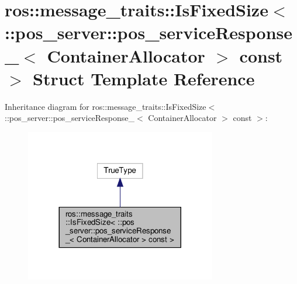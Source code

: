 \hypertarget{structros_1_1message__traits_1_1IsFixedSize_3_01_1_1pos__server_1_1pos__serviceResponse___3_01Co91c5eac0a9bc81187c37812e12655669}{}\section{ros\+:\+:message\+\_\+traits\+:\+:Is\+Fixed\+Size$<$ \+:\+:pos\+\_\+server\+:\+:pos\+\_\+service\+Response\+\_\+$<$ Container\+Allocator $>$ const $>$ Struct Template Reference}
\label{structros_1_1message__traits_1_1IsFixedSize_3_01_1_1pos__server_1_1pos__serviceResponse___3_01Co91c5eac0a9bc81187c37812e12655669}


Inheritance diagram for ros\+:\+:message\+\_\+traits\+:\+:Is\+Fixed\+Size$<$ \+:\+:pos\+\_\+server\+:\+:pos\+\_\+service\+Response\+\_\+$<$ Container\+Allocator $>$ const $>$\+:
\nopagebreak
\begin{figure}[H]
\begin{center}
\leavevmode
\includegraphics[width=236pt]{structros_1_1message__traits_1_1IsFixedSize_3_01_1_1pos__server_1_1pos__serviceResponse___3_01Coc89bc9fb0ea0e185a417ba40b92ce2a6}
\end{center}
\end{figure}


